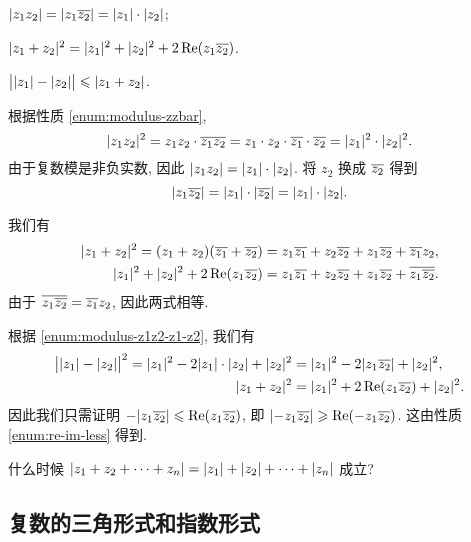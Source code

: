 \begin{exampleenum}[证明:]
  \item $\lvert z_1z_2\rvert=\lvert z_1\overline{z_2}\rvert=\lvert z_1\rvert\cdot\lvert z_2\rvert$;
  \label{enum:modulus-z1z2-z1-z2}
  \item $\lvert z_1+z_2\rvert^2=\lvert z_1\rvert^2+\lvert z_2\rvert^2+2\operatorname{Re}(z_1\overline{z_2})$.
  \item $\bigl\vert\lvert z_1\rvert-\lvert z_2\rvert\bigr\vert\leqslant\lvert z_1+z_2\rvert$.
\end{exampleenum}

\begin{proofenumr}
  \item 根据性质 \ref{enum:modulus-zzbar},
  \[
      \lvert z_1z_2\rvert^2=z_1z_2\cdot\overline{z_1}\overline{z_2}
    =z_1\cdot z_2\cdot \overline{z_1}\cdot \overline{z_2}
    =\lvert z_1\rvert^2\cdot\lvert z_2\rvert^2.
  \]
  由于复数模是非负实数, 因此 $\lvert z_1z_2\rvert=\lvert z_1\rvert\cdot\lvert z_2\rvert$.
  将 $z_2$ 换成 $\overline{z_2}$ 得到
  \[
      \lvert z_1\overline{z_2}\rvert
    =\lvert z_1\rvert\cdot\lvert\overline{z_2}\rvert
    =\lvert z_1\rvert\cdot\lvert z_2\rvert.
  \]
  \item 我们有
  \begin{align*}
      \lvert z_1+z_2\rvert^2
    =(z_1+z_2)(\overline{z_1}+\overline{z_2})&
    =z_1\overline{z_1}+z_2\overline{z_2}+z_1\overline{z_2}+\overline{z_1}z_2,\\
      \lvert z_1\rvert^2+\lvert z_2\rvert^2+2\operatorname{Re}(z_1\overline{z_2})&
    =z_1\overline{z_1}+z_2\overline{z_2}+z_1\overline{z_2}+\overline{z_1\overline{z_2}}.
  \end{align*}
  由于 $\overline{z_1\overline{z_2}}=\overline{z_1}z_2$, 因此两式相等.
  \item 根据 \ref{enum:modulus-z1z2-z1-z2}, 我们有
  \begin{align*}
      \bigl\vert\lvert z_1\rvert-\lvert z_2\rvert\bigr\vert^2
    =\lvert z_1\rvert^2-2\lvert z_1\rvert\cdot\lvert z_2\rvert+\lvert z_2\rvert^2&
    =\lvert z_1\rvert^2-2\lvert z_1 \overline{z_2}\rvert+\lvert z_2\rvert^2,\\
      \lvert z_1+z_2\rvert^2&
    =\lvert z_1\rvert^2+2\operatorname{Re}(z_1 \overline{z_2})+\lvert z_2\rvert^2.
  \end{align*}
  因此我们只需证明 $-\lvert z_1 \overline{z_2}\rvert\leqslant \operatorname{Re}(z_1 \overline{z_2})$, 即 $\lvert-z_1 \overline{z_2}\rvert\geqslant \operatorname{Re}(-z_1 \overline{z_2})$.
  这由性质 \ref{enum:re-im-less} 得到.
  \qedhere
\end{proofenumr}

\begin{exercise}
  什么时候 $\lvert z_1+z_2+\cdots+z_n\rvert=\lvert z_1\rvert+\lvert z_2\rvert+\cdots+\lvert z_n\rvert$ 成立?
\end{exercise}


\subsection{复数的三角形式和指数形式}

